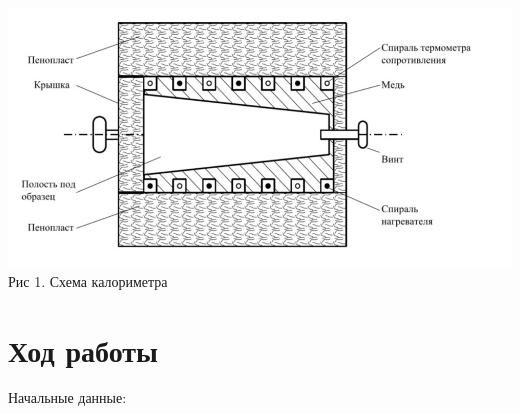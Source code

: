 \documentclass[a4paper, 12pt]{article}
\begin{document}
	\begin{center}
		\includegraphics[width= 15cm]{"Установка1.jpg"}\\
		Рис 1. Схема калориметра
	\end{center}
	
	
	\section{Ход работы}
	Начальные данные:	
	
\end{document}
